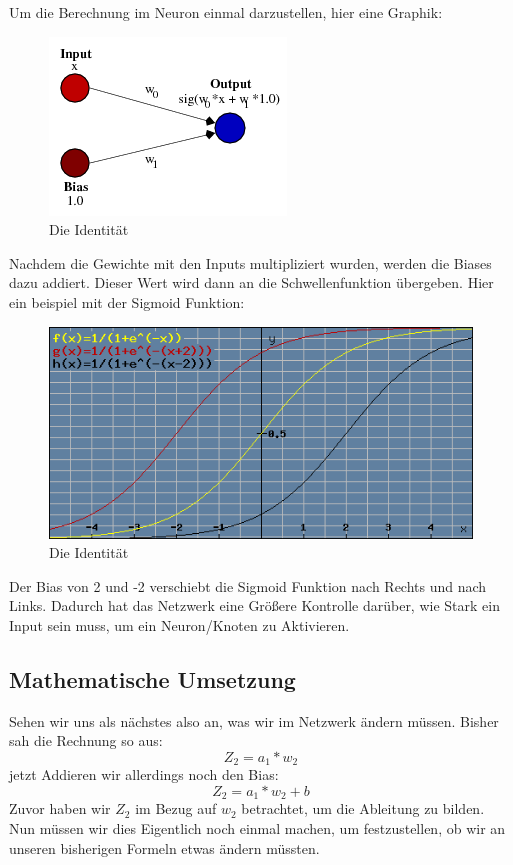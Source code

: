 \documentclass[12pt]{article}
\begin{document}
Um die Berechnung im Neuron einmal darzustellen, hier eine Graphik:\begin{figure}[H]
\centering
\includegraphics[scale=0.60]{./Images/Pasted image 20231005133406.png}
\caption{Die Identität}
\label{Was kommt hier rein?}\end{figure}Nachdem die Gewichte mit den Inputs multipliziert wurden, werden die Biases dazu addiert. Dieser Wert wird dann an die Schwellenfunktion übergeben. Hier ein beispiel mit der Sigmoid Funktion:\begin{figure}[H]
\centering
\includegraphics[scale=0.60]{./Images/Pasted image 20231005145933.png}
\caption{Die Identität}
\label{Was kommt hier rein?}\end{figure}Der Bias von 2 und -2 verschiebt die Sigmoid Funktion nach Rechts und nach Links. Dadurch hat das Netzwerk eine Größere Kontrolle darüber, wie Stark ein Input sein muss, um ein Neuron/Knoten zu Aktivieren.\subsection{Mathematische Umsetzung}Sehen wir uns als nächstes also an, was wir im Netzwerk ändern müssen. Bisher sah die Rechnung so aus:$$Z_2 = a_1 * w_2$$jetzt Addieren wir allerdings noch den Bias: $$Z_2 = a_1 * w_2 + b$$
Zuvor haben wir $Z_2$ im Bezug auf $w_2$ betrachtet, um die Ableitung zu bilden. Nun müssen wir dies Eigentlich noch einmal machen, um festzustellen, ob wir an unseren bisherigen Formeln etwas ändern müssten.
\end{document}
